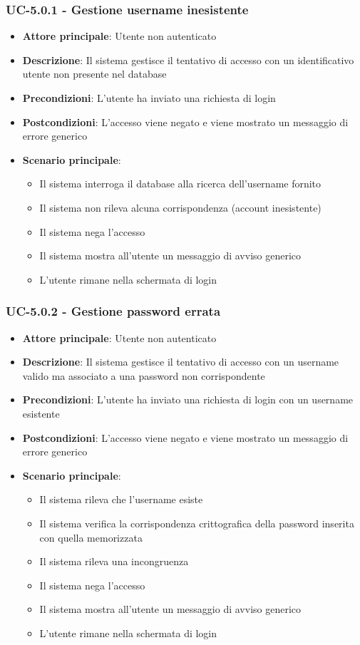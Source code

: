 \documentclass[11pt,a4paper]{article}
\begin{document}
\subsubsection{UC-5.0.1 - Gestione username inesistente}
\begin{itemize}
    \item \textbf{Attore principale}: Utente non autenticato
    \item \textbf{Descrizione}: Il sistema gestisce il tentativo di accesso con un identificativo utente non presente nel database
    \item \textbf{Precondizioni}: L’utente ha inviato una richiesta di login
    \item \textbf{Postcondizioni}: L’accesso viene negato e viene mostrato un messaggio di errore generico
    \item \textbf{Scenario principale}:
    \begin{itemize}
        \item Il sistema interroga il database alla ricerca dell'username fornito
        \item Il sistema non rileva alcuna corrispondenza (account inesistente)
        \item Il sistema nega l'accesso
        \item Il sistema mostra all’utente un messaggio di avviso generico
        \item L'utente rimane nella schermata di login
    \end{itemize}
\end{itemize}

\subsubsection{UC-5.0.2 - Gestione password errata}
\begin{itemize}
    \item \textbf{Attore principale}: Utente non autenticato
    \item \textbf{Descrizione}: Il sistema gestisce il tentativo di accesso con un username valido ma associato a una password non corrispondente
    \item \textbf{Precondizioni}: L’utente ha inviato una richiesta di login con un username esistente
    \item \textbf{Postcondizioni}: L’accesso viene negato e viene mostrato un messaggio di errore generico
    \item \textbf{Scenario principale}:
    \begin{itemize}
        \item Il sistema rileva che l'username esiste
        \item Il sistema verifica la corrispondenza crittografica della password inserita con quella memorizzata
        \item Il sistema rileva una incongruenza
        \item Il sistema nega l'accesso
        \item Il sistema mostra all’utente un messaggio di avviso generico
        \item L'utente rimane nella schermata di login
    \end{itemize}
\end{itemize}
\end{document}
